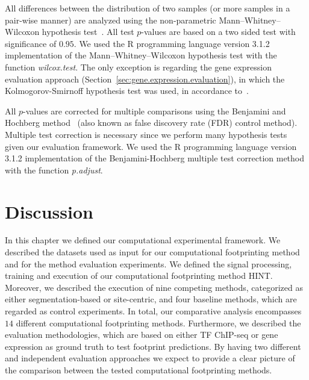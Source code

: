 All differences between the distribution of two samples (or more samples in a pair-wise manner) are analyzed using the non-parametric Mann–Whitney–Wilcoxon hypothesis test~\citep{duda2000}. All test $p$-values are based on a two sided test with significance of $0.95$. We used the R programming language version 3.1.2 implementation of the Mann–Whitney–Wilcoxon hypothesis test with the function \emph{wilcox.test}. The only exception is regarding the gene expression evaluation approach (Section~\ref{sec:gene.expression.evaluation}), in which the Kolmogorov-Smirnoff hypothesis test was used, in accordance to~\cite{yardimci2014}.

All $p$-values are corrected for multiple comparisons using the Benjamini and Hochberg method~\citep{benjamini1995} (also known as false discovery rate (FDR) control method). Multiple test correction is necessary since we perform many hypothesis tests given our evaluation framework. We used the R programming language version 3.1.2 implementation of the Benjamini-Hochberg multiple test correction method with the function \emph{p.adjust}.

\section{Discussion}
\label{sec:discussion.4}

In this chapter we defined our computational experimental framework. We described the datasets used as input for our computational footprinting method and for the method evaluation experiments. We defined the signal processing, training and execution of our computational footprinting method HINT. Moreover, we described the execution of nine competing methods, categorized as either segmentation-based or site-centric, and four baseline methods, which are regarded as control experiments. In total, our comparative analysis encompasses $14$ different computational footprinting methods. Furthermore, we described the evaluation methodologies, which are based on either TF ChIP-seq or gene expression as ground truth to test footprint predictions. By having two different and independent evaluation approaches we expect to provide a clear picture of the comparison between the tested computational footprinting methods.

